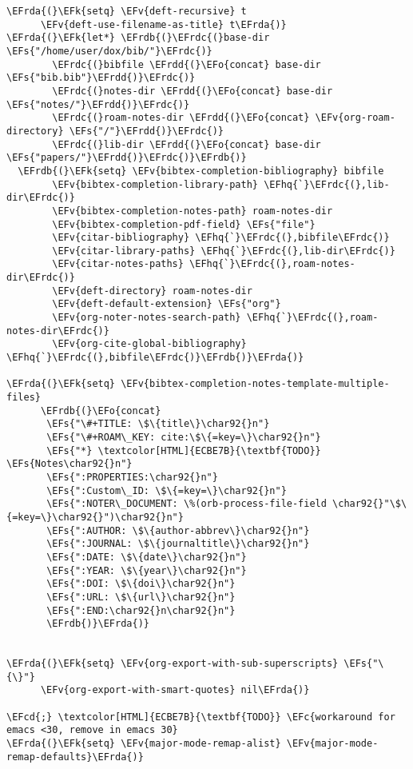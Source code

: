 \documentclass[a4wide,10pt]{article}
\newcommand{\EFc}[1]{\textcolor{EFc}{#1}} %
\newcommand{\EFcd}[1]{\textcolor{EFcd}{#1}} %
\newcommand{\EFs}[1]{\textcolor{EFs}{#1}} %
\newcommand{\EFk}[1]{\textcolor{EFk}{#1}} %
\newcommand{\EFv}[1]{\textcolor{EFv}{#1}} %
\newcommand{\EFo}[1]{\textcolor{EFo}{#1}} %
\newcommand{\EFhq}[1]{\textcolor{EFhq}{#1}} %
\newcommand{\EFrda}[1]{\textcolor{EFrda}{#1}} %
\newcommand{\EFrdb}[1]{\textcolor{EFrdb}{#1}} %
\newcommand{\EFrdc}[1]{\textcolor{EFrdc}{#1}} %
\newcommand{\EFrdd}[1]{\textcolor{EFrdd}{#1}} %
\begin{document}
\begin{Code}
\begin{Verbatim}
\EFrda{(}\EFk{setq} \EFv{deft-recursive} t
      \EFv{deft-use-filename-as-title} t\EFrda{)}
\EFrda{(}\EFk{let*} \EFrdb{(}\EFrdc{(}base-dir \EFs{"/home/user/dox/bib/"}\EFrdc{)}
        \EFrdc{(}bibfile \EFrdd{(}\EFo{concat} base-dir \EFs{"bib.bib"}\EFrdd{)}\EFrdc{)}
        \EFrdc{(}notes-dir \EFrdd{(}\EFo{concat} base-dir \EFs{"notes/"}\EFrdd{)}\EFrdc{)}
        \EFrdc{(}roam-notes-dir \EFrdd{(}\EFo{concat} \EFv{org-roam-directory} \EFs{"/"}\EFrdd{)}\EFrdc{)}
        \EFrdc{(}lib-dir \EFrdd{(}\EFo{concat} base-dir \EFs{"papers/"}\EFrdd{)}\EFrdc{)}\EFrdb{)}
  \EFrdb{(}\EFk{setq} \EFv{bibtex-completion-bibliography} bibfile
        \EFv{bibtex-completion-library-path} \EFhq{`}\EFrdc{(},lib-dir\EFrdc{)}
        \EFv{bibtex-completion-notes-path} roam-notes-dir
        \EFv{bibtex-completion-pdf-field} \EFs{"file"}
        \EFv{citar-bibliography} \EFhq{`}\EFrdc{(},bibfile\EFrdc{)}
        \EFv{citar-library-paths} \EFhq{`}\EFrdc{(},lib-dir\EFrdc{)}
        \EFv{citar-notes-paths} \EFhq{`}\EFrdc{(},roam-notes-dir\EFrdc{)}
        \EFv{deft-directory} roam-notes-dir
        \EFv{deft-default-extension} \EFs{"org"}
        \EFv{org-noter-notes-search-path} \EFhq{`}\EFrdc{(},roam-notes-dir\EFrdc{)}
        \EFv{org-cite-global-bibliography} \EFhq{`}\EFrdc{(},bibfile\EFrdc{)}\EFrdb{)}\EFrda{)}

\EFrda{(}\EFk{setq} \EFv{bibtex-completion-notes-template-multiple-files}
      \EFrdb{(}\EFo{concat}
       \EFs{"\#+TITLE: \$\{title\}\char92{}n"}
       \EFs{"\#+ROAM\_KEY: cite:\$\{=key=\}\char92{}n"}
       \EFs{"*} \textcolor[HTML]{ECBE7B}{\textbf{TODO}} \EFs{Notes\char92{}n"}
       \EFs{":PROPERTIES:\char92{}n"}
       \EFs{":Custom\_ID: \$\{=key=\}\char92{}n"}
       \EFs{":NOTER\_DOCUMENT: \%(orb-process-file-field \char92{}"\$\{=key=\}\char92{}")\char92{}n"}
       \EFs{":AUTHOR: \$\{author-abbrev\}\char92{}n"}
       \EFs{":JOURNAL: \$\{journaltitle\}\char92{}n"}
       \EFs{":DATE: \$\{date\}\char92{}n"}
       \EFs{":YEAR: \$\{year\}\char92{}n"}
       \EFs{":DOI: \$\{doi\}\char92{}n"}
       \EFs{":URL: \$\{url\}\char92{}n"}
       \EFs{":END:\char92{}n\char92{}n"}
       \EFrdb{)}\EFrda{)}


\EFrda{(}\EFk{setq} \EFv{org-export-with-sub-superscripts} \EFs{"\{\}"}
      \EFv{org-export-with-smart-quotes} nil\EFrda{)}

\EFcd{;} \textcolor[HTML]{ECBE7B}{\textbf{TODO}} \EFc{workaround for emacs <30, remove in emacs 30}
\EFrda{(}\EFk{setq} \EFv{major-mode-remap-alist} \EFv{major-mode-remap-defaults}\EFrda{)}


\end{Verbatim}
\end{Code}
\end{document}
